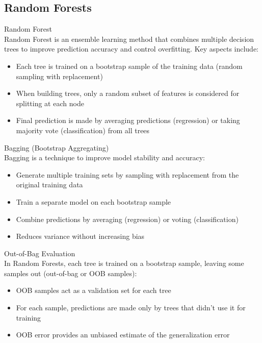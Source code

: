 \raggedcolumns
\columnbreak

\subsection{Random Forests}

\begin{definition}{Random Forest}\\
Random Forest is an ensemble learning method that combines multiple decision trees to improve prediction accuracy and control overfitting. Key aspects include:
\begin{itemize}
    \item Each tree is trained on a bootstrap sample of the training data (random sampling with replacement)
    \item When building trees, only a random subset of features is considered for splitting at each node
    \item Final prediction is made by averaging predictions (regression) or taking majority vote (classification) from all trees
\end{itemize}
\end{definition}

\begin{concept}{Bagging (Bootstrap Aggregating)}\\
Bagging is a technique to improve model stability and accuracy:
\begin{itemize}
    \item Generate multiple training sets by sampling with replacement from the original training data
    \item Train a separate model on each bootstrap sample
    \item Combine predictions by averaging (regression) or voting (classification)
    \item Reduces variance without increasing bias
\end{itemize}
\end{concept}

\begin{concept}{Out-of-Bag Evaluation}\\
In Random Forests, each tree is trained on a bootstrap sample, leaving some samples out (out-of-bag or OOB samples):
\begin{itemize}
    \item OOB samples act as a validation set for each tree
    \item For each sample, predictions are made only by trees that didn't use it for training
    \item OOB error provides an unbiased estimate of the generalization error
\end{itemize}
\end{concept}

